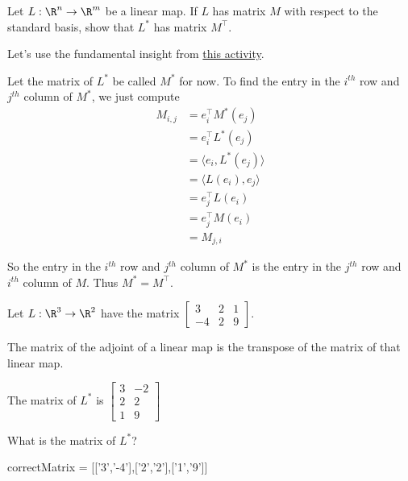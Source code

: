 \documentclass{ximera}
\begin{document}
Let $L: \R^n \to \R^m$ be a linear map.
If $L$ has matrix $M$ with respect to the standard basis, show that $L^*$ has matrix $M^\top$.
\begin{free-response}
  Let's use the fundamental insight from \href{http://ximera.osu.edu/course/kisonecat/m2o2c2/course/activity/week1/inner-product/multiply-dot/}{this activity}.  
  
  Let the matrix of $L^*$ be called $M^*$ for now.
  To find the entry in the $i^{th}$ row and $j^{th}$ column of $M^*$, we just  compute 
  \begin{align*}
    M_{i,j} &= e_i^\top M^*(e_j)\\
    &=e_i^\top L^*(e_j)\\
    &= \langle e_i , L^*(e_j)\rangle\\
    &= \langle  L(e_i), e_j \rangle\\
    &=e_j^\top L(e_i)\\
    &=e_j^\top M(e_i)\\
    &= M_{j,i}
  \end{align*}
  
  So the entry  in the $i^{th}$ row and $j^{th}$ column of $M^*$ is the entry in the $j^{th}$ row and $i^{th}$ column of $M$.  Thus $M^* = M^\top$.
\end{free-response}

\begin{question}
  Let $L:\R^3 \to \R^2$ have the matrix \(\begin{bmatrix} 3&2 &1\\ -4&2&9\end{bmatrix}\).
  \begin{solution}
    \begin{hint}
      The matrix of the adjoint of a linear map is the transpose of the matrix of that linear map.
    \end{hint}
    \begin{hint}
      The matrix of $L^*$ is \(\begin{bmatrix} 3&-2\\ 2&2\\1&9\end{bmatrix}\)
    \end{hint}
    What is the matrix of $L^*$?
    \begin{matrix-answer}
      correctMatrix = [['3','-4'],['2','2'],['1','9']]
    \end{matrix-answer}
  \end{solution}
\end{question}


	
\end{document}

